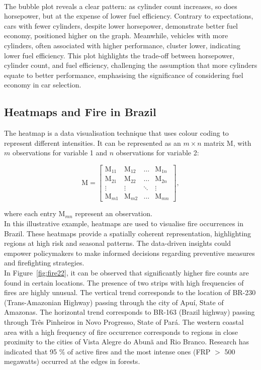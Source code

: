\documentclass{article}\usepackage[]{graphicx}\usepackage[]{xcolor}
\begin{document}
\\\noindent The bubble plot reveals a clear pattern: as cylinder count increases, so does horsepower, but at the expense of lower fuel efficiency. Contrary to expectations, cars with fewer cylinders, despite lower horsepower, demonstrate better fuel economy, positioned higher on the graph. Meanwhile, vehicles with more cylinders, often associated with higher performance, cluster lower, indicating lower fuel efficiency. This plot highlights the trade-off between horsepower, cylinder count, and fuel efficiency, challenging the assumption that more cylinders equate to better performance, emphasising the significance of considering fuel economy in car selection.

\subsection{Heatmaps and Fire in Brazil}
The heatmap is a data visualisation technique that uses colour coding to represent different intensities. It can be represented as an $m \times n$ matrix $\mathrm{M}$, with $m$ observations for variable 1 and $n$ observations for variable 2:

$$\mathrm{M} =
\left[
\begin{array}{cccc}
    \mathrm{M}_{11} & \mathrm{M}_{12} & \ldots & \mathrm{M}_{1n} \\  
    \mathrm{M}_{21} & \mathrm{M}_{22} & \ldots & \mathrm{M}_{2n} \\  
    \vdots & \vdots & \ddots & \vdots \\  
    \mathrm{M}_{m1} & \mathrm{M}_{m2} & \ldots & \mathrm{M}_{mn}
\end{array}
\right],
$$

\noindent
where each entry $\mathrm{M}_{mn}$ represent an observation.\\

\noindent
In this illustrative example, heatmaps are used to visualise fire occurrences in Brazil. These heatmaps provide a spatially coherent representation, highlighting regions at high risk and seasonal patterns. The data-driven insights could empower policymakers to make informed decisions regarding preventive measures and firefighting strategies.\\

\noindent
In Figure~\ref{fig:fire22}, it can be observed that significantly higher fire counts are found in certain locations. The presence of two strips with high frequencies of fires are highly unusual. The vertical trend corresponds to the location of BR-230 (Trans-Amazonian Highway) passing through the city of Apuí, State of Amazonas. The horizontal trend corresponds to BR-163 (Brazil highway) passing through Três Pinheiros in Novo Progresso, State of Pará. The western coastal area with a high frequency of fire occurrence corresponds to regions in close proximity to the cities of Vista Alegre do Abunã and Rio Branco. Research has indicated that 95 \% of active fires and the most intense ones (FRP $>$ 500 megawatts) occurred at the edges in forests\cite{forest}.\\
\end{document}
